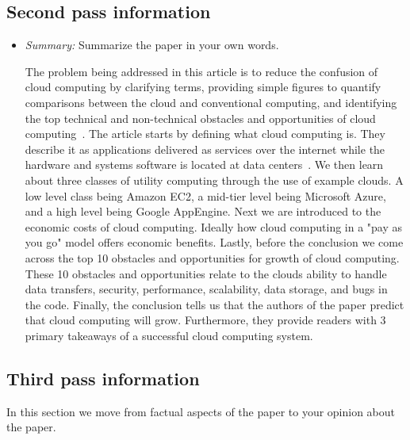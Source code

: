 \documentclass[letterpaper,twocolumn,10pt]{article}
\begin{document}
\subsection{Second pass information}
\label{sec:second}

\begin{itemize}

\item {\it Summary:} Summarize the paper in your own words. 

The problem being addressed in this article is to reduce the confusion of cloud computing by clarifying 
terms, providing simple figures to quantify comparisons between the cloud and conventional computing,
and identifying the top technical and non-technical obstacles and opportunities of cloud computing~\cite{aview}.
The article starts by defining what cloud computing is. They describe it as applications delivered as services
over the internet while the hardware and systems software is located at data centers~\cite{aview}. We then learn about
three classes of utility computing through the use of example clouds. A low level class being Amazon EC2, 
a mid-tier level being Microsoft Azure, and a high level being Google AppEngine. Next we are introduced to the 
economic costs of cloud computing. Ideally how cloud computing in a "pay as you go" model offers economic benefits. 
Lastly, before the conclusion 
we come across the top 10 obstacles and opportunities for growth of cloud computing. These 10 obstacles and
opportunities relate to the clouds ability to handle data transfers, security, performance, scalability, data storage,
and bugs in the code. Finally, the conclusion tells us that the authors of the paper predict that cloud computing 
will grow. Furthermore, they provide readers with 3 primary takeaways of a successful cloud computing system. 

\end{itemize}

\subsection{Third pass information}
\label{sec:third}

In this section we move from factual aspects of the paper to
your opinion about the paper.
\end{document}
